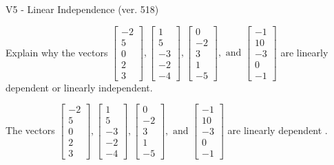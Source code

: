 \begin{exercise}
  \begin{exerciseTitle}V5 - Linear Independence (ver. 518)\end{exerciseTitle}
  \begin{exerciseStatement}
    Explain why the vectors \(\left[\begin{array}{r}
-2 \\
5 \\
0 \\
2 \\
3
\end{array}\right] , \left[\begin{array}{r}
1 \\
5 \\
-3 \\
-2 \\
-4
\end{array}\right] , \left[\begin{array}{r}
0 \\
-2 \\
3 \\
1 \\
-5
\end{array}\right] , \text{ and } \left[\begin{array}{r}
-1 \\
10 \\
-3 \\
0 \\
-1
\end{array}\right]\) are linearly dependent or linearly independent.	


  \end{exerciseStatement}
  \begin{exerciseAnswer}
   The vectors \(\left[\begin{array}{r}
-2 \\
5 \\
0 \\
2 \\
3
\end{array}\right] , \left[\begin{array}{r}
1 \\
5 \\
-3 \\
-2 \\
-4
\end{array}\right] , \left[\begin{array}{r}
0 \\
-2 \\
3 \\
1 \\
-5
\end{array}\right] , \text{ and } \left[\begin{array}{r}
-1 \\
10 \\
-3 \\
0 \\
-1
\end{array}\right]\) are 
  	 linearly dependent  .
  


  \end{exerciseAnswer}
\end{exercise}